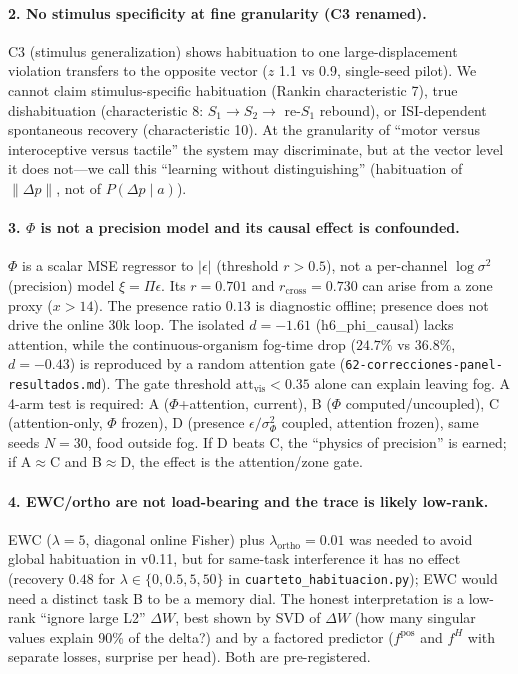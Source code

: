 \documentclass[11pt,a4paper]{article}
\begin{document}
\paragraph{2. No stimulus specificity at fine granularity (C3 renamed).} C3 (stimulus generalization) shows habituation to one large-displacement violation transfers to the opposite vector ($z$ 1.1 vs 0.9, single-seed pilot). We cannot claim stimulus-specific habituation (Rankin characteristic 7), true dishabituation (characteristic 8: $S_1\rightarrow S_2\rightarrow$ re-$S_1$ rebound), or ISI-dependent spontaneous recovery (characteristic 10). At the granularity of ``motor versus interoceptive versus tactile'' the system may discriminate, but at the vector level it does not---we call this ``learning without distinguishing'' (habituation of $\|\Delta p\|$, not of $P(\Delta p\mid a)$).

\paragraph{3. $\Phi$ is not a precision model and its causal effect is confounded.} $\Phi$ is a scalar MSE regressor to $|\epsilon|$ (threshold $r>0.5$), not a per-channel $\log \sigma^2$ (precision) model $\xi=\Pi\epsilon$. Its $r=0.701$ and $r_{\mathrm{cross}}=0.730$ can arise from a zone proxy ($x>14$). The presence ratio $0.13$ is diagnostic offline; presence does not drive the online 30k loop. The isolated $d=-1.61$ (h6\_phi\_causal) lacks attention, while the continuous-organism fog-time drop ($24.7\%$ vs $36.8\%$, $d=-0.43$) is reproduced by a random attention gate (\texttt{62-correcciones-panel-resultados.md}). The gate threshold $\mathrm{att}_{\mathrm{vis}}<0.35$ alone can explain leaving fog. A 4-arm test is required: A ($\Phi$+attention, current), B ($\Phi$ computed/uncoupled), C (attention-only, $\Phi$ frozen), D (presence $\epsilon/\sigma_\Phi^2$ coupled, attention frozen), same seeds $N=30$, food outside fog. If D beats C, the ``physics of precision'' is earned; if A$\approx$C and B$\approx$D, the effect is the attention/zone gate.

\paragraph{4. EWC/ortho are not load-bearing and the trace is likely low-rank.} EWC ($\lambda=5$, diagonal online Fisher) plus $\lambda_{\mathrm{ortho}}=0.01$ was needed to avoid global habituation in v0.11, but for same-task interference it has no effect (recovery $0.48$ for $\lambda\in\{0,0.5,5,50\}$ in \texttt{cuarteto\_habituacion.py}); EWC would need a distinct task B to be a memory dial. The honest interpretation is a low-rank ``ignore large L2'' $\Delta W$, best shown by SVD of $\Delta W$ (how many singular values explain 90\% of the delta?) and by a factored predictor ($f^{\mathrm{pos}}$ and $f^{H}$ with separate losses, surprise per head). Both are pre-registered.
\end{document}
